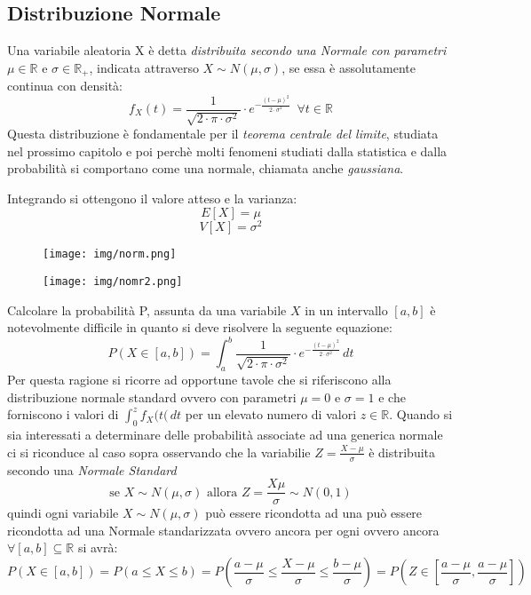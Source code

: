 \documentclass[a4paper,12pt, oneside]{book}
\newcommand{\numberset}{\mathbb}
\newcommand{\R}{\numberset{R}}
\begin{document}
\subsection{Distribuzione Normale}
Una variabile aleatoria X è detta \emph{distribuita secondo una Normale con parametri} $\mu \in \R$ e $\sigma \in \R_+$,
indicata attraverso $X \sim N(\mu, \sigma)$, se essa è assolutamente continua con densità:
\[f_X(t)=\frac{1}{\sqrt{2\cdot \pi\cdot \sigma^2}}\cdot e^{-\frac{(t-\mu)^2}{2\cdot \sigma^2}}\,\,\,\forall t\in\R\]
Questa distribuzione è fondamentale per il \emph{teorema centrale del limite}, studiata nel prossimo
capitolo e poi perchè molti fenomeni studiati dalla statistica e dalla probabilità si comportano come una
normale, chiamata anche \emph{gaussiana}.

Integrando si ottengono il valore atteso e la varianza:
\[E[X] = \mu\]
\[V[X] = \sigma^2\]
\begin{figure}
    \texttt{[image: img/norm.png]}
\end{figure}
\begin{figure}
    \texttt{[image: img/nomr2.png]}
\end{figure}
Calcolare la probabilità P, assunta da una variabile $X$ in un intervallo $[a, b]$ è notevolmente difficile in
quanto si deve risolvere la seguente equazione:
\[P(X \in [a,b]) = \int_a^b \frac{1}{\sqrt{2\cdot \pi\cdot \sigma^2}}\cdot e^{-\frac{(t-\mu)^2}{2\cdot \sigma^2}}\,dt\]
Per questa ragione si ricorre ad opportune tavole che si riferiscono alla distribuzione normale standard 
ovvero con parametri $\mu = 0$ e $\sigma = 1$ e che forniscono i valori di $\int_0^z f_X(t(\,dt$ 
per un elevato numero di valori $z \in \R$.\newline
Quando si sia interessati a determinare delle probabilità associate ad una generica normale ci si riconduce al
caso sopra osservando che la variabilie $Z = \frac{X - \mu}{\sigma}$ è distribuita secondo una \emph{Normale Standard}
\[\mbox{se } X \sim N(\mu, \sigma) \mbox{ allora } Z = \frac{X \mu}{\sigma} \sim N(0,1)\]
quindi ogni variabile $X \sim N(\mu, \sigma)$ può essere ricondotta ad una può essere ricondotta ad una Normale
standarizzata ovvero ancora per ogni ovvero ancora $\forall [a,b] \subseteq \R$ si avrà:
\[P(X \in [a,b]) = P(a \leq X \leq b) =P \left(\frac{a - \mu}{\sigma} \leq \frac{X-\mu}{\sigma} \leq 
                   \frac{b-\mu}{\sigma}\right) = P \left(Z \in \left[\frac{a-\mu}{\sigma},\frac{a-\mu}{\sigma}\right]\right)\]
\end{document}
